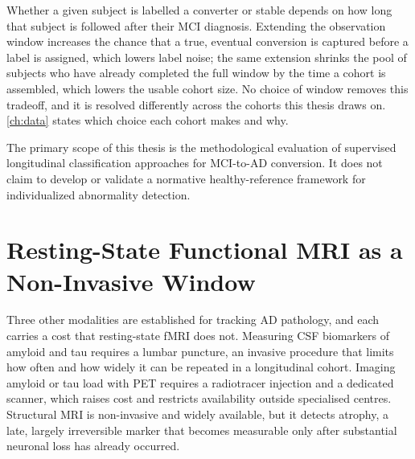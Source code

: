 Whether a given subject is labelled a converter or stable depends on how long that subject
is followed after their \ac{MCI} diagnosis. Extending the observation window increases the
chance that a true, eventual conversion is captured before a label is assigned, which
lowers label noise; the same extension shrinks the pool of subjects who have already
completed the full window by the time a cohort is assembled, which lowers the usable
cohort size. No choice of window removes this tradeoff, and it is resolved differently
across the cohorts this thesis draws on. \autoref{ch:data} states which choice each cohort
makes and why.

The primary scope of this thesis is the methodological evaluation of supervised
longitudinal classification approaches for \ac{MCI}-to-\ac{AD} conversion. It does not
claim to develop or validate a normative healthy-reference framework for individualized
abnormality detection.

\section{Resting-State Functional MRI as a Non-Invasive Window}\label{sec:rsfmri}

Three other modalities are established for tracking \ac{AD} pathology, and each carries a
cost that resting-state \ac{fMRI} does not. Measuring \ac{CSF} biomarkers of amyloid and
tau requires a lumbar puncture, an invasive procedure that limits how often and how widely
it can be repeated in a longitudinal cohort. Imaging amyloid or tau load with \ac{PET}
requires a radiotracer injection and a dedicated scanner, which raises cost and restricts
availability outside specialised centres. Structural \ac{MRI} is non-invasive and widely
available, but it detects atrophy, a late, largely irreversible marker that becomes
measurable only after substantial neuronal loss has already occurred.

